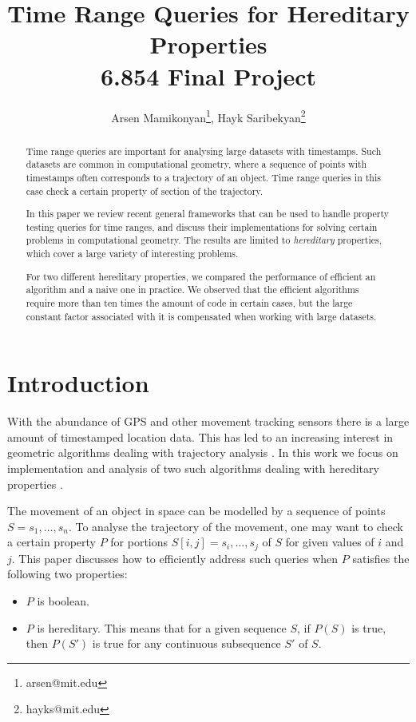 \documentclass{article}
\begin{document}
\title{Time Range Queries for Hereditary Properties \\ \large 6.854 Final Project}
\author{Arsen Mamikonyan\thanks{arsen@mit.edu}, Hayk Saribekyan\thanks{hayks@mit.edu}}

\maketitle

\begin{abstract}
    Time range queries are important for analysing large datasets
    with timestamps. Such datasets are common in computational
    geometry, where a sequence of points with timestamps often
    corresponds to a trajectory of an object. Time range queries
    in this case check a certain property of section of the trajectory.

    In this paper we review recent general frameworks that can be
    used to handle property testing queries for time ranges, and
    discuss their implementations for solving certain problems in
    computational geometry. The results are limited to \textit{hereditary}
    properties, which cover a large variety of interesting problems.

    For two different hereditary properties, we compared the
    performance of efficient an algorithm and a naive one in practice.
    We observed that the efficient algorithms require more than ten
    times the amount of code in certain cases, but the large constant
    factor associated with it is compensated when working with large
    datasets.
\end{abstract}

\section{Introduction}
\label{sec:intro}

With the abundance of GPS and other movement tracking sensors there
is a large amount of timestamped location data.  This has led to
an increasing interest in geometric algorithms dealing with trajectory
analysis \cite{buchin2011finding, gudmundsson2007efficient,
aronov2016segmentation}.  In this work we focus on implementation
and analysis of two such algorithms dealing with hereditary properties
\cite{bokal2015, chan2016}.

The movement of an object in space can be modelled by a sequence
of points $S = s_1, \dots, s_n$. To analyse the trajectory of the
movement, one may want to check a certain property $P$ for portions
$S[i, j] = s_i, \dots, s_j$ of $S$ for given values of $i$ and $j$.
This paper discusses how to efficiently address such queries when
$P$ satisfies the following two properties:
\begin{itemize}
    \item $P$ is boolean.
    \item $P$ is hereditary. This means that for a given sequence
    $S$, if $P(S)$ is true, then $P(S')$ is true for any continuous
    subsequence $S'$ of $S$.
\end{itemize}
\end{document}
